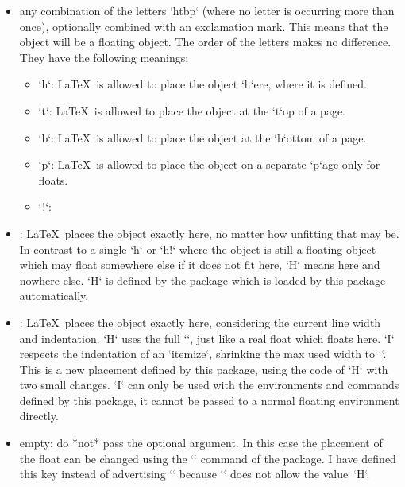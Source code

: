    \begin{itemize}
   \item any combination of the letters `htbp` (where no letter is occurring more than once), optionally combined with an exclamation mark.
     This means that the object will be a floating object.
     The order of the letters makes no difference.
     They have the following meanings:
     \begin{itemize}
     \item `h`: \LaTeX\ is allowed to place the object `h`ere, where it is defined.
     \item `t`: \LaTeX\ is allowed to place the object at the `t`op of a page.
     \item `b`: \LaTeX\ is allowed to place the object at the `b`ottom of a page.
     \item `p`: \LaTeX\ is allowed to place the object on a separate `p`age only for floats.
     \item `!`: 
     \end{itemize}
   \item {}: \LaTeX\ places the object exactly here, no matter how unfitting that may be.
      In contrast to a single `h` or `h!` where the object is still a floating object which may float somewhere else if it does not fit here,
      `H` means here and nowhere else.
      `H` is defined by the  package which is loaded by this package automatically.
   \item {}: \LaTeX\ places the object exactly here, considering the current line width and indentation.
      `H` uses the full `\columnwidth`, just like a real float which floats here.
      `I` respects the indentation of an `itemize`, shrinking the max used width to `\linewidth`.
      This is a new placement defined by this package, using the code of `H` with two small changes.
      `I` can only be used with the environments and commands defined by this package, it cannot be passed to a normal floating environment directly.
   \item empty: do *not* pass the optional argument.
     In this case the placement of the float can be changed using the `\floatplacement` command of the  package.
     I have defined this key instead of advertising `\floatplacement` because `\floatplacement` does not allow the value~`H`.
   \end{itemize}

